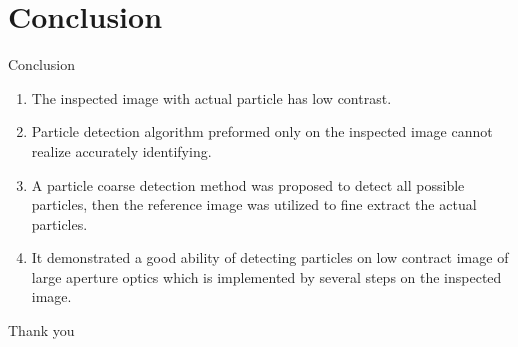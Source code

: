\documentclass[14pt,hyperref={CJKbookmarks=true}]{beamer}
\theoremstyle{plain}
\theoremstyle{definition}
\theoremstyle{remark}
\begin{document}
\section{Conclusion}
\begin{frame}{Conclusion}
\small
\begin{enumerate}
\item  The inspected image with actual particle has low contrast.
\item  Particle detection algorithm preformed only on the inspected image cannot realize accurately identifying.
\item A particle coarse detection method was proposed to  detect all possible particles, then the reference image was utilized to fine extract the actual particles.
\item It demonstrated a good ability of detecting particles on low contract image of large aperture optics which is implemented by several steps on the inspected image.
\end{enumerate}
\end{frame}
\begin{frame}
\Huge
\begin{center}
Thank you
\end{center}


\end{frame}
\end{document}

